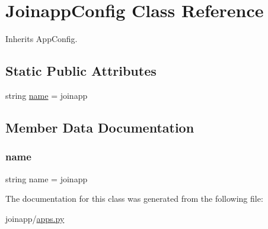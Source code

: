 \hypertarget{classjoinapp_1_1apps_1_1_joinapp_config}{}\section{Joinapp\+Config Class Reference}
\label{classjoinapp_1_1apps_1_1_joinapp_config}


Inherits App\+Config.

\subsection*{Static Public Attributes}
\begin{DoxyCompactItemize}
\item 
string \mbox{\hyperlink{classjoinapp_1_1apps_1_1_joinapp_config_a8ccf841cb59e451791bcb2e1ac4f1edc}{name}} = \textquotesingle{}joinapp\textquotesingle{}
\end{DoxyCompactItemize}


\subsection{Member Data Documentation}
\mbox{\label{classjoinapp_1_1apps_1_1_joinapp_config_a8ccf841cb59e451791bcb2e1ac4f1edc}} 
\subsubsection{\texorpdfstring{name}{name}}
{\footnotesize\ttfamily string name = \textquotesingle{}joinapp\textquotesingle{}\hspace{0.3cm}{\ttfamily [static]}}



The documentation for this class was generated from the following file\+:\begin{DoxyCompactItemize}
\item 
joinapp/\mbox{\hyperlink{apps_8py}{apps.\+py}}\end{DoxyCompactItemize}

